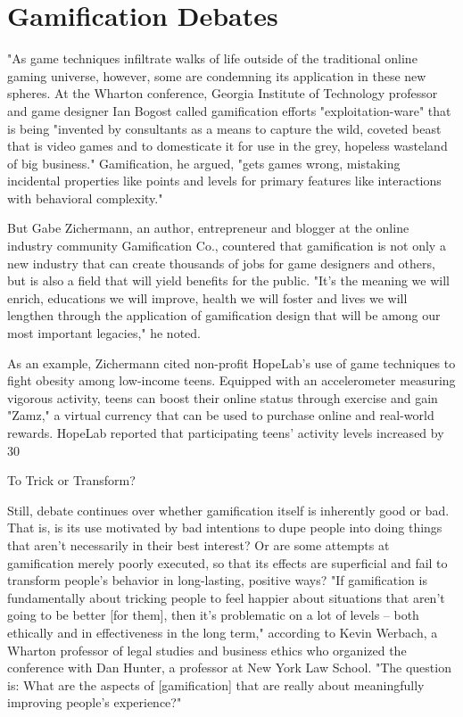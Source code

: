\section{Gamification Debates}
"As game techniques infiltrate walks of life outside of the traditional online gaming universe, however, some are condemning its application in these new spheres. At the Wharton conference, Georgia Institute of Technology professor and game designer Ian Bogost called gamification efforts "exploitation-ware" that is being "invented by consultants as a means to capture the wild, coveted beast that is video games and to domesticate it for use in the grey, hopeless wasteland of big business." Gamification, he argued, "gets games wrong, mistaking incidental properties like points and levels for primary features like interactions with behavioral complexity."

But Gabe Zichermann, an author, entrepreneur and blogger at the online industry community Gamification Co., countered that gamification is not only a new industry that can create thousands of jobs for game designers and others, but is also a field that will yield benefits for the public. "It's the meaning we will enrich, educations we will improve, health we will foster and lives we will lengthen through the application of gamification design that will be among our most important legacies," he noted.

As an example, Zichermann cited non-profit HopeLab's use of game techniques to fight obesity among low-income teens. Equipped with an accelerometer measuring vigorous activity, teens can boost their online status through exercise and gain "Zamz," a virtual currency that can be used to purchase online and real-world rewards. HopeLab reported that participating teens' activity levels increased by 30%

To Trick or Transform?

Still, debate continues over whether gamification itself is inherently good or bad. That is, is its use motivated by bad intentions to dupe people into doing things that aren't necessarily in their best interest? Or are some attempts at gamification merely poorly executed, so that its effects are superficial and fail to transform people's behavior in long-lasting, positive ways? "If gamification is fundamentally about tricking people to feel happier about situations that aren't going to be better [for them], then it's problematic on a lot of levels -- both ethically and in effectiveness in the long term," according to Kevin Werbach, a Wharton professor of legal studies and business ethics who organized the conference with Dan Hunter, a professor at New York Law School. "The question is: What are the aspects of [gamification] that are really about meaningfully improving people's experience?"

